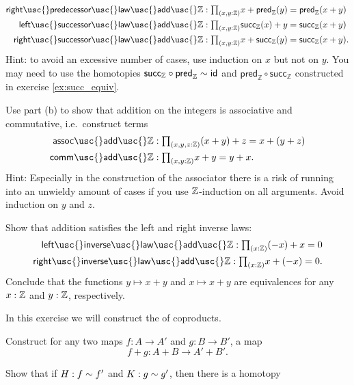 \begin{exercises}
\begin{subexenum}
\begin{align*}
\mathsf{right\usc{}predecessor\usc{}law\usc{}add\usc{}}\Z & : \prd{x,y:\Z} x+\mathsf{pred}_{\mathbb{Z}}(y) = \mathsf{pred}_{\mathbb{Z}}(x+y) \\
\mathsf{left\usc{}successor\usc{}law\usc{}add\usc{}}\Z & : \prd{x,y:\Z} \mathsf{succ}_{\mathbb{Z}}(x)+y = \mathsf{succ}_{\mathbb{Z}}(x+y) \\
\mathsf{right\usc{}successor\usc{}law\usc{}add\usc{}}\Z & : \prd{x,y:\Z} x+\mathsf{succ}_{\mathbb{Z}}(y) = \mathsf{succ}_{\mathbb{Z}}(x+y).
\end{align*}
Hint: to avoid an excessive number of cases, use induction on $x$ but not on $y$. You may need to use the homotopies $\mathsf{succ}_{\mathbb{Z}}\circ \mathsf{pred}_{\mathbb{Z}}\sim \mathsf{id}_{}$ and $\mathsf{pred}_{\mathbb{Z}}\circ\mathsf{succ}_{\mathbb{Z}}$ constructed in exercise \cref{ex:succ_equiv}.
\item Use part (b) to show that addition on the integers is associative and commutative, i.e.~construct terms
\begin{align*}
\mathsf{assoc\usc{}add\usc{}}\Z & : \prd{x,y,z:\Z} (x+y)+z = x + (y+z) \\
\mathsf{comm\usc{}add\usc{}}\Z & : \prd{x,y:\Z} x+y = y+x.
\end{align*}
Hint: Especially in the construction of the associator there is a risk of running into an unwieldy amount of cases if you use $\mathbb{Z}$-induction on all arguments. Avoid induction on $y$ and $z$.
\item Show that addition satisfies the left and right inverse laws:
\begin{align*}
\mathsf{left\usc{}inverse\usc{}law\usc{}add\usc{}}\Z : \prd{x : \Z} (-x)+x=0 \\
\mathsf{right\usc{}inverse\usc{}law\usc{}add\usc{}}\Z : \prd{x : \Z} x + (-x)=0.
\end{align*}
Conclude that the functions $y \mapsto x + y$ and $x\mapsto x + y$ are equivalences for any $x:\mathbb{Z}$ and $y:\mathbb{Z}$, respectively.
\end{subexenum}
\item \label{ex:coproduct_functor}In this exercise we will construct the  of coproducts.
\begin{subexenum}
\item Construct for any two maps $f:A \to A'$ and $g:B \to B'$, a map
\begin{equation*}
f+g:A+B \to A'+B'.
\end{equation*}
\item Show that if $H:f\sim f'$ and $K:g\sim g'$, then there is a homotopy

\end{subexenum}
\end{exercises}
